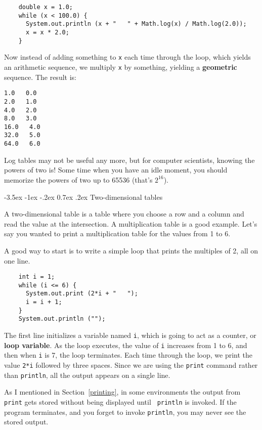 \documentclass{book}
\makeatletter
\renewcommand{\section}{\@startsection 
    {section} {1} {0mm}%
    {-3.5ex \@plus -1ex \@minus -.2ex}%
    {0.7ex \@plus.2ex}%
    {\normalfont\Large\bfseries}}
\makeatother
\begin{document}
\begin{verbatim}
    double x = 1.0;
    while (x < 100.0) {
      System.out.println (x + "   " + Math.log(x) / Math.log(2.0));
      x = x * 2.0;
    }
\end{verbatim}
%
Now instead of adding something to {\tt x} each time through
the loop, which yields an arithmetic sequence, we multiply
{\tt x} by something, yielding a {\bf geometric} sequence.
The result is:

\begin{verbatim}
1.0   0.0
2.0   1.0
4.0   2.0
8.0   3.0
16.0   4.0
32.0   5.0
64.0   6.0
\end{verbatim}
%
Log tables may not be useful any more, but for computer scientists,
knowing the powers of two is!  Some time when you have an idle
moment, you should memorize the powers of two up to 65536
(that's $2^{16}$).

\section{Two-dimensional tables}

A two-dimensional table is a table where you choose a row and
a column and read the value at the intersection.  A multiplication
table is a good example.  Let's say you wanted to print a
multiplication table for the values from 1 to 6.

A good way to start is to write a simple loop that prints
the multiples of 2, all on one line.

\begin{verbatim}
    int i = 1;
    while (i <= 6) {
      System.out.print (2*i + "   ");
      i = i + 1;
    }
    System.out.println ("");
\end{verbatim}
%
The first line initializes a variable named {\tt i}, which is
going to act as a counter, or {\bf loop variable}.  As the
loop executes, the value of {\tt i} increases from 1 to 6,
and then when {\tt i} is 7, the loop terminates.  Each
time through the loop, we print the value {\tt 2*i} followed
by three spaces.  Since we are using the {\tt print} command
rather than {\tt println}, all the output appears on a single
line.


As I mentioned in Section~\ref{printing}, in some environments the
output from {\tt print} gets stored without being displayed until {\tt
println} is invoked.  If the program terminates, and you forget to
invoke {\tt println}, you may never see the stored output.
\end{document}
